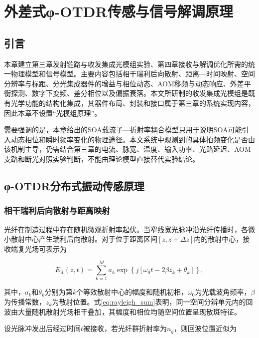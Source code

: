 \chapter{外差式φ-OTDR传感与信号解调原理}

\section{引言}

本章建立第三章发射链路与收发集成光模组实验、第四章接收与解调优化所需的统一物理模型和信号模型。主要内容包括相干瑞利后向散射、距离—时间映射、空间分辨率与标距、分光集成器件的增益与相位动态、AOM移频与动态响应、外差平衡探测、数字下变频、差分相位以及偏振衰落。本文所研制的收发集成光模组是既有光学功能的结构化集成，其器件布局、封装和接口属于第三章的系统实现内容，因此本章不设置“光模组原理”。

需要强调的是，本章给出的SOA载流子—折射率耦合模型只用于说明SOA可能引入动态相位和瞬时频率变化的物理途径。本文系统中观测到的具体拍频变化是否由该机制主导，仍需结合第三章的电流、脉宽、温度、输入功率、光路延迟、AOM支路和断光对照实验判断，不能由理论模型直接替代实验结论。

\section{φ-OTDR分布式振动传感原理}

\subsection{相干瑞利后向散射与距离映射}

光纤在制造过程中存在随机微观折射率起伏。当窄线宽光脉冲沿光纤传播时，各微小散射中心产生瑞利后向散射。对于位于距离区间$[z,z+\Delta z]$内的散射中心，接收端复光场可表示为

\begin{equation}
E_{\mathrm R}(z,t)
=
\sum_{k=1}^{M}
a_k
\exp\!\left\{
j\left[
\omega_0 t
-2\beta z_k
+\theta_k
\right]
\right\},
\label{eq:rayleigh_sum}
\end{equation}

其中，$a_k$和$\theta_k$分别为第$k$个等效散射中心的幅度和随机初相，$\omega_0$为光载波角频率，$\beta$为传播常数，$z_k$为散射位置。式\eqref{eq:rayleigh_sum}表明，同一空间分辨单元内的回波由大量随机散射光场相干叠加，其幅度和相位均随空间位置呈现散斑特征\cite{posey2000strain,liokumovich2015fundamentals,he2021review,liu2022advances,liu2025rayleigh_thesis}。

设光脉冲发出后经过时间$t$被接收，若光纤群折射率为$n_g$，则回波位置近似为

